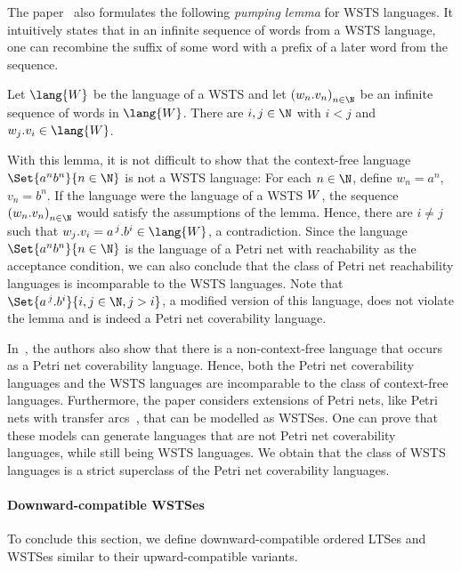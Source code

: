 \documentclass[../../diss.tex]{subfiles}
\begin{document}
The paper~\cite{GeeraertsRV07} also formulates the following \emph{pumping lemma} for WSTS languages.
It intuitively states that in an infinite sequence of words from a WSTS language, one can recombine the suffix of some word with a prefix of a later word from the sequence.

\begin{lemma}
    Let $\lang{\wsts}$ be the language of a WSTS and let ${(w_n.v_n)}_{n \in \N}$ be an infinite sequence of words in $\lang{\wsts}$.
    There are $i, j \in \N$ with $i < j$ and $w_j.v_i \in \lang{\wsts}$.
\end{lemma}

With this lemma, it is not difficult to show that the context-free language $\Set{a^n b^n}{n \in \N}$ is not a WSTS language:
For each $n \in \N$, define $w_n = a^n$, $v_n = b^n$.
If the language were the language of a WSTS $W$, the sequence ${(w_n.v_n)}_{n \in \N}$ would satisfy the assumptions of the lemma.
Hence, there are $i \neq j$ such that $w_j.v_i = a^{\,j}.b^i \in \lang{\wsts}$, a contradiction.
Since the language $\Set{a^n b^n}{n \in \N}$ is the language of a Petri net with reachability as the acceptance condition, we can also conclude that the class of Petri net reachability languages is incomparable to the WSTS languages.
Note that $\Set{ a^{\,j}.b^i }{i,j \in \N, j > i}$, a modified version of this language, does not violate the lemma and is indeed a Petri net coverability language.

In~\cite{GeeraertsRV07}, the authors also show that there is a non-context-free language that occurs as a Petri net coverability language.
Hence, both the Petri net coverability languages and the WSTS languages are incomparable to the class of context-free languages.
Furthermore, the paper considers extensions of Petri nets, like Petri nets with transfer arcs~\cite{DufourdFS98}, that can be modelled as WSTSes.
One can prove that these models can generate languages that are not Petri net coverability languages, while still being WSTS languages.
We obtain that the class of WSTS languages is a strict superclass of the Petri net coverability languages.

\paragraph{Downward-compatible WSTSes}

To conclude this section, we define downward-compatible ordered LTSes and WSTSes similar to their upward-compatible variants.
\end{document}
